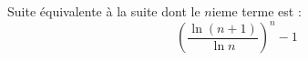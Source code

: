 Suite \'equivalente \`a la suite  dont le $n$ieme terme est : \[(\frac{\ln(n+1)}{\ln n})^n-1\] \bigskip